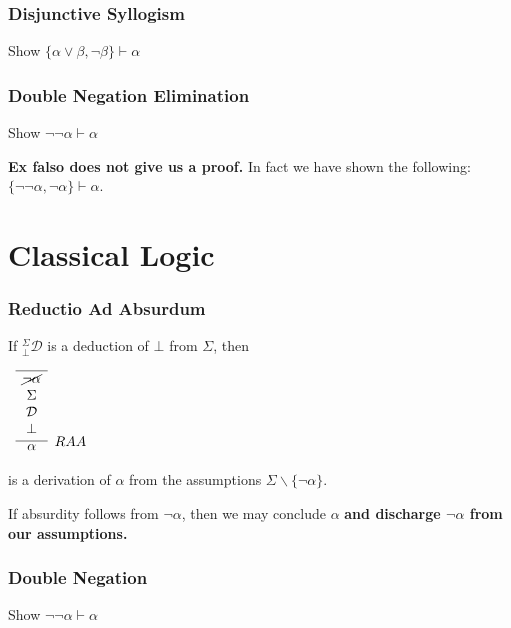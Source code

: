 \documentclass{beamer}
\theoremstyle{indentDefn} \newtheorem{defn}[]{Definition}
\begin{document}
\begin{frame}
	\frametitle{Disjunctive Syllogism}
	
	Show $\{\alpha \lor \beta, \lnot\beta\} \vdash \alpha$
	\vspace{7cm}
	
\end{frame}

\begin{frame}
	\frametitle{Double Negation Elimination}
	
	Show $\lnot\lnot \alpha \vdash \alpha$ 
	\vspace{5cm}
	
	\pause
	
	{\bf Ex falso does not give us a proof.} In fact we have shown the following: $\{\lnot\lnot\alpha, \lnot\alpha\} \vdash \alpha$.
	
\end{frame}

\section{Classical Logic}


\begin{frame}
	\frametitle{Reductio Ad Absurdum}
	
	If $^{\Sigma}_{\bot}\mathcal{D}$ is a deduction of $\bot$ from $\Sigma$, then
	
	\begin{center}		
		$\begin{array}{c}		
		\infer[RAA]{\alpha}
		{\begin{array}{c} \hline \cancel{\lnot\alpha} \\ \Sigma \\ \mathcal{D} \\ \bot \end{array}}
		\end{array}$
	\end{center}
	
	is a derivation of $\alpha$ from the assumptions $\Sigma \backslash\{\lnot\alpha\}$.
	
	\vspace{0.5cm}
	
	If absurdity follows from $\lnot\alpha$, then we may conclude $\alpha$ {\bf and discharge $\lnot \alpha$ from our assumptions.}
	 
\end{frame}

\begin{frame}
	\frametitle{Double Negation}	
	
	Show $\lnot\lnot\alpha \vdash \alpha$
	\vspace{7cm}	
	
\end{frame}
\end{document}
